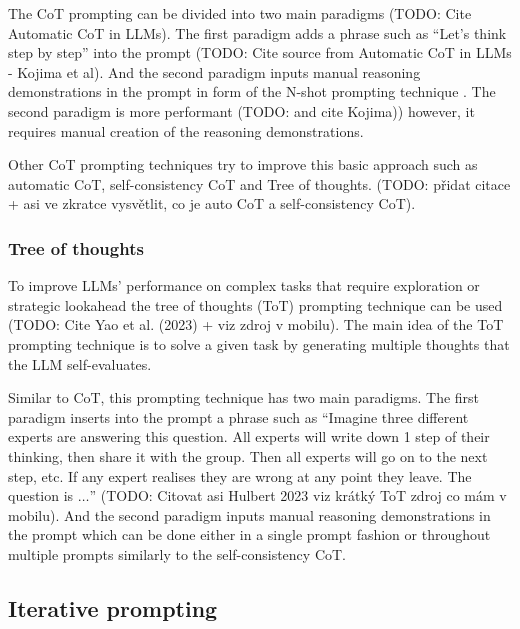 The CoT prompting can be divided into two main paradigms (TODO: Cite Automatic CoT in LLMs). The first paradigm adds a phrase such as ``Let's think step by step'' into the prompt (TODO: Cite source from Automatic CoT in LLMs - Kojima et al). And the second paradigm inputs manual reasoning demonstrations in the prompt in form of the N-shot prompting technique \cite{Wei2022}. 
The second paradigm is more performant \cite{Wei2022} (TODO: and cite Kojima)) however, it requires manual creation of the reasoning demonstrations.

Other CoT prompting techniques try to improve this basic approach such as automatic CoT, self-consistency CoT and Tree of thoughts. (TODO: přidat citace + asi ve zkratce vysvětlit, co je auto CoT a self-consistency CoT).


\subsubsection{Tree of thoughts}

To improve LLMs' performance on complex tasks that require exploration or strategic lookahead the tree of thoughts (ToT) prompting technique can be used (TODO: Cite Yao et al. (2023) + \cite{Long2023} viz zdroj v mobilu). The main idea of the ToT prompting technique is to solve a given task by generating multiple thoughts that the LLM self-evaluates.

Similar to CoT, this prompting technique has two main paradigms. The first paradigm inserts into the prompt a phrase such as ``Imagine three different experts are answering this question. All experts will write down 1 step of their thinking, then share it with the group. Then all experts will go on to the next step, etc. If any expert realises they are wrong at any point they leave. The question is $\ldots$'' (TODO: Citovat asi Hulbert 2023 viz krátký ToT zdroj co mám v mobilu). And the second paradigm inputs manual reasoning demonstrations in the prompt which can be done either in a single prompt fashion or throughout multiple prompts similarly to the self-consistency CoT.


\subsection{Iterative prompting}

